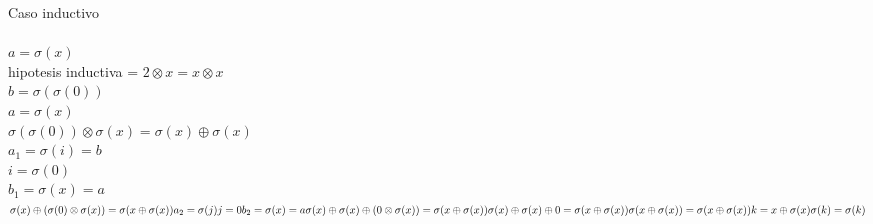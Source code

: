 \documentclass{article}
\begin{document}
Caso inductivo\\
\\
{$ a =\sigma(x) $}\\
hipotesis inductiva = {$ 2\otimes x = x\otimes x$}\\
{$ b= \sigma(\sigma(0))$}\\
{$ a = \sigma(x)$}\\
{$ \sigma(\sigma(0))\otimes \sigma(x) = \sigma(x) \oplus \sigma(x)$}\\
{$ a_1 = \sigma(i) = b$}\\
{$ i= \sigma(0)$}\\
{$ b_1 = \sigma(x) = a$}\\
\begin{math}
\sigma(x)\oplus (\sigma(0)\otimes \sigma(x)) = \sigma(x\oplus \sigma(x))\\
a_2= \sigma(j)\\
j = 0\\
b_2 = \sigma(x) =a\\

\sigma(x)\oplus \sigma(x)\oplus (0\otimes \sigma(x) ) = \sigma(x\oplus \sigma(x))\\
\sigma(x)\oplus \sigma(x)\oplus 0 = \sigma(x\oplus \sigma(x))\\
\sigma(x\oplus \sigma(x)) = \sigma(x\oplus \sigma(x))\\
\\
k = x\oplus \sigma(x)\\
\sigma(k) = \sigma(k)\\

\end{math}
\end{document}

